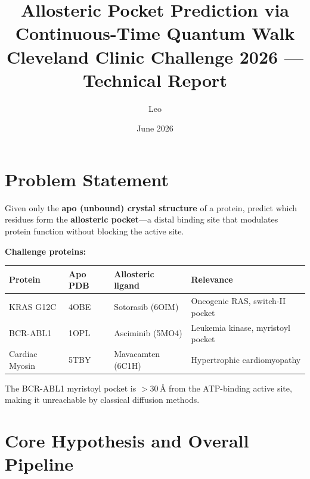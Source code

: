 \documentclass[11pt,a4paper]{article}
\title{%
  \sffamily\LARGE\bfseries
  Allosteric Pocket Prediction via\\
  Continuous-Time Quantum Walk\\[6pt]
  \large\normalfont\sffamily\color{cGray}
  Cleveland Clinic Challenge 2026 --- Technical Report
}
\author{\sffamily Leo}
\date{\sffamily June 2026}
\begin{document}
\maketitle
\tableofcontents
\vspace{1em}

\section{Problem Statement}

Given only the \textbf{apo (unbound) crystal structure} of a protein, predict which
residues form the \textbf{allosteric pocket}---a distal binding site that modulates
protein function without blocking the active site.

\vspace{0.5em}
\noindent\textbf{Challenge proteins:}

\begin{table}[H]
\centering
\begin{tabular}{llll}
\toprule
\textbf{Protein} & \textbf{Apo PDB} & \textbf{Allosteric ligand} & \textbf{Relevance} \\
\midrule
KRAS G12C       & 4OBE & Sotorasib (6OIM)  & Oncogenic RAS, switch-II pocket \\
BCR-ABL1        & 1OPL & Asciminib (5MO4)  & Leukemia kinase, myristoyl pocket \\
Cardiac Myosin  & 5TBY & Mavacamten (6C1H) & Hypertrophic cardiomyopathy \\
\bottomrule
\end{tabular}
\end{table}

The BCR-ABL1 myristoyl pocket is $>$30\,\r{A} from the ATP-binding active site,
making it unreachable by classical diffusion methods.

\section{Core Hypothesis and Overall Pipeline}
\end{document}
